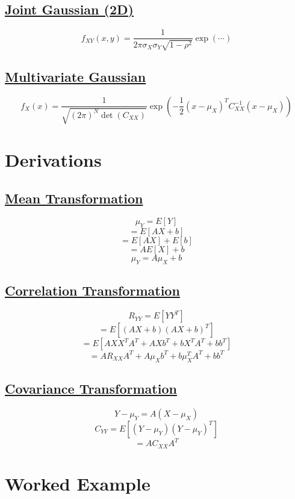 \documentclass[11pt]{article}
\begin{document}
\vspace{0.5cm}
\subsection*{\underline{Joint Gaussian (2D)}}
\[
f_{XY}(x,y) = \frac{1}{2\pi\sigma_X\sigma_Y\sqrt{1-\rho^2}} \exp(\cdots)
\]

\vspace{0.5cm}
\subsection*{\underline{Multivariate Gaussian}}
\[
f_X(x) = \frac{1}{\sqrt{(2\pi)^N \det(C_{XX})}} 
\exp\left(-\frac{1}{2}(x-\mu_X)^T C_{XX}^{-1}(x-\mu_X)\right)
\]

\vspace{1cm}
\section{Derivations}

\vspace{0.5cm}
\subsection*{\underline{Mean Transformation}}
\[
\mu_Y = E[Y]
\]
\[
= E[AX + b]
\]
\[
= E[AX] + E[b]
\]
\[
= AE[X] + b
\]
\[
\mu_Y = A\mu_X + b
\]

\vspace{0.5cm}
\subsection*{\underline{Correlation Transformation}}
\[
R_{YY} = E[YY^T]
\]
\[
= E[(AX + b)(AX + b)^T]
\]
\[
= E[AXX^TA^T + AXb^T + bX^TA^T + bb^T]
\]
\[
= AR_{XX}A^T + A\mu_X b^T + b\mu_X^T A^T + bb^T
\]

\vspace{0.5cm}
\subsection*{\underline{Covariance Transformation}}
\[
Y - \mu_Y = A(X - \mu_X)
\]
\[
C_{YY} = E[(Y - \mu_Y)(Y - \mu_Y)^T]
\]
\[
= AC_{XX}A^T
\]

\vspace{1cm}
\section{Worked Example}
\end{document}
